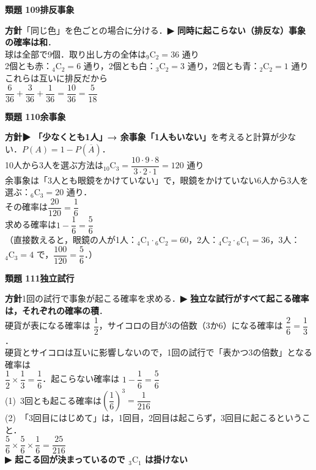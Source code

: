 \documentclass[a4paper,11pt]{ltjsarticle}
\newcommand{\ans}[2]{\Needspace{5\baselineskip}\vspace{6pt}%
  {\sffamily\bfseries 類題 #1\quad #2}\par}
\newcommand{\point}[1]{\textsf{\bfseries ▶ #1}}
\begin{document}
\ans{109}{排反事象}
\begin{kai}
\textbf{方針}\quad 「同じ色」を色ごとの場合に分ける．\point{同時に起こらない（排反な）事象の確率は和}．\\[2pt]
球は全部で9個．取り出し方の全体は\quad ${}_9\mathrm C_2=36$ 通り\\[2pt]
2個とも赤：${}_4\mathrm C_2=6$ 通り，\quad 2個とも白：${}_3\mathrm C_2=3$ 通り，\quad 2個とも青：${}_2\mathrm C_2=1$ 通り\\
これらは互いに排反だから\\
\hspace*{1.5em}$\dfrac{6}{36}+\dfrac{3}{36}+\dfrac{1}{36}=\dfrac{10}{36}=\dfrac{5}{18}$
\end{kai}

\ans{110}{余事象}
\begin{kai}
\textbf{方針}\quad \point{「少なくとも1人」→ 余事象「1人もいない」}を考えると計算が少ない．$P(A)=1-P(\overline A)$．\\[2pt]
10人から3人を選ぶ方法は\quad ${}_{10}\mathrm C_3=\dfrac{10\cdot9\cdot8}{3\cdot2\cdot1}=120$ 通り\\
余事象は「3人とも眼鏡をかけていない」で，眼鏡をかけていない6人から3人を選ぶ：${}_6\mathrm C_3=20$ 通り．\\
その確率は\quad $\dfrac{20}{120}=\dfrac16$\\[2pt]
求める確率は\quad $1-\dfrac16=\dfrac56$\\[2pt]
（直接数えると，眼鏡の人が1人：${}_4\mathrm C_1\cdot{}_6\mathrm C_2=60$，2人：${}_4\mathrm C_2\cdot{}_6\mathrm C_1=36$，3人：${}_4\mathrm C_3=4$ で，$\dfrac{100}{120}=\dfrac56$．）
\end{kai}

\ans{111}{独立試行}
\begin{kai}
\textbf{方針}\quad 1回の試行で事象が起こる確率を求める．\point{独立な試行がすべて起こる確率は，それぞれの確率の積}．\\[2pt]
硬貨が表になる確率は $\dfrac12$，サイコロの目が3の倍数（3か6）になる確率は $\dfrac26=\dfrac13$．\\
硬貨とサイコロは互いに影響しないので，1回の試行で「表かつ3の倍数」となる確率は\\
\hspace*{1.5em}$\dfrac12\times\dfrac13=\dfrac16$．\quad 起こらない確率は $1-\dfrac16=\dfrac56$\\[2pt]
(1)\ 3回とも起こる確率は\quad $\left(\dfrac16\right)^3=\dfrac1{216}$\\[2pt]
(2)\ 「3回目にはじめて」は，1回目，2回目は起こらず，3回目に起こるということ．\\
\hspace*{1.5em}$\dfrac56\times\dfrac56\times\dfrac16=\dfrac{25}{216}$\\
\hspace*{1.5em}\point{起こる回が決まっているので ${}_3\mathrm C_1$ は掛けない}
\end{kai}
\end{document}
